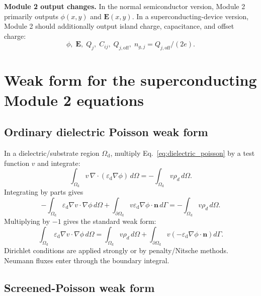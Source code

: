 \documentclass[11pt]{article}
\newcommand{\Evec}{\mathbf{E}}
\newcommand{\nvecb}{\mathbf{n}}
\newcommand{\Omd}{\Omega_{\mathrm{d}}}
\newcommand{\epsd}{\varepsilon_{\mathrm{d}}}
\begin{document}
\begin{physicsbox}
\textbf{Module 2 output changes.} In the normal semiconductor version, Module 2 primarily outputs $\phi(x,y)$ and $\Evec(x,y)$. In a superconducting-device version, Module 2 should additionally output island charge, capacitance, and offset charge:
\begin{equation}
\phi,\; \Evec,\; Q_j,\; C_{ij},\; Q_{j,\mathrm{off}},\; n_{g,j}=Q_{j,\mathrm{off}}/(2e).
\end{equation}
\end{physicsbox}

\section{Weak form for the superconducting Module 2 equations}

\subsection{Ordinary dielectric Poisson weak form}

In a dielectric/substrate region $\Omd$, multiply Eq.~\eqref{eq:dielectric_poisson} by a test function $v$ and integrate:
\begin{equation}
\int_{\Omd} v\,\nabla\cdot(\epsd\nabla\phi)\,d\Omega
= -\int_{\Omd} v\rho_d\,d\Omega.
\end{equation}
Integrating by parts gives
\begin{equation}
-\int_{\Omd}\epsd\nabla v\cdot\nabla\phi\,d\Omega
+\int_{\partial\Omd}v\epsd\nabla\phi\cdot\nvecb\,d\Gamma
= -\int_{\Omd}v\rho_d\,d\Omega.
\end{equation}
Multiplying by $-1$ gives the standard weak form:
\begin{equation}
\boxed{\int_{\Omd}\epsd\nabla v\cdot\nabla\phi\,d\Omega
= \int_{\Omd}v\rho_d\,d\Omega
+ \int_{\partial\Omd}v\left(-\epsd\nabla\phi\cdot\nvecb\right)d\Gamma.}
\label{eq:dielectric_weak_form}
\end{equation}
Dirichlet conditions are applied strongly or by penalty/Nitsche methods. Neumann fluxes enter through the boundary integral.

\subsection{Screened-Poisson weak form}
\end{document}
